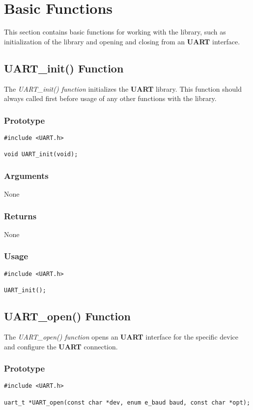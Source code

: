 \documentclass{report}
\begin{document}
\section{Basic Functions}
This section contains basic functions for working with the library, such
as initialization of the library and opening and closing from an \textbf{UART}
interface.
\subsection{UART\_init() Function}
The \textit{UART\_init() function} initializes the \textbf{UART} library.
This function should always called first before usage of any other
functions with the library.
\subsubsection*{Prototype}
\begin{lstlisting}
#include <UART.h>

void UART_init(void);
\end{lstlisting}
\subsubsection*{Arguments}
None
\subsubsection*{Returns}
None
\subsubsection*{Usage}
\begin{lstlisting}
#include <UART.h>

UART_init();
\end{lstlisting}
\subsection{UART\_open() Function}
The \textit{UART\_open() function} opens an \textbf{UART} interface for
the specific device and configure the \textbf{UART} connection.
\subsubsection*{Prototype}
\begin{lstlisting}
#include <UART.h>

uart_t *UART_open(const char *dev, enum e_baud baud, const char *opt);
\end{lstlisting}
\end{document}

